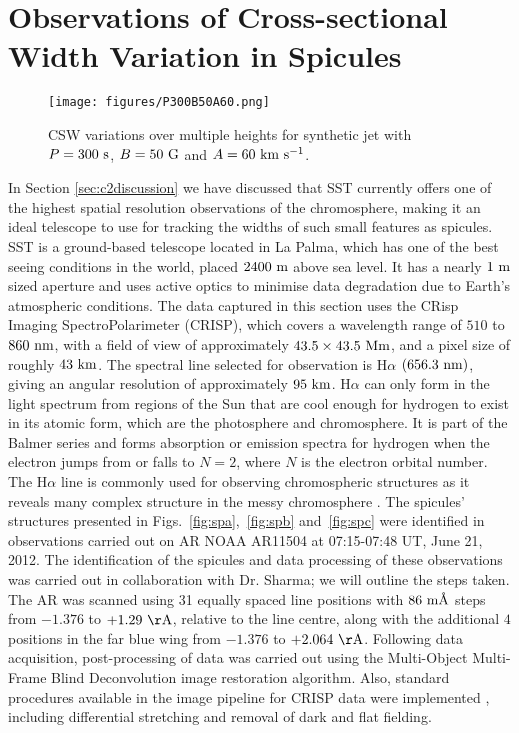 \section{Observations of Cross-sectional Width Variation in Spicules}
\label{sec:CSW_spicules}
\begin{figure*}
\texttt{[image: figures/P300B50A60.png]}
\caption{CSW variations over multiple heights for synthetic jet with $P=300~\rm{s}$, $B=50~\rm{G}$ and $A=60~\rm{km ~s^{-1}}$.} 
\label{CSW_m_heights} 
\end{figure*}
In Section \ref{sec:c2discussion} we have discussed that SST currently offers one of the highest spatial resolution observations of the chromosphere, making it an ideal telescope to use for tracking the widths of such small features as spicules. SST is a ground-based telescope located in La Palma, which has one of the best seeing conditions in the world, placed $2400~\rm{m}$ above sea level. It has a nearly $1~\rm{m}$ sized aperture and uses active optics to minimise data degradation due to Earth's atmospheric conditions. The data captured in this section uses the CRisp Imaging SpectroPolarimeter (CRISP), which covers a wavelength range of $510$ to $860~\rm{nm}$, with a field of view of approximately $43.5\times43.5~\rm{Mm}$, and a pixel size of roughly $43~\rm{km}$. The spectral line selected for observation is H$\alpha$ $(656.3~\rm{nm})$, giving an angular resolution of approximately $95~\rm{km}$. H$\alpha$ can only form in the light spectrum from regions of the Sun that are cool enough for hydrogen to exist in its atomic form, which are the photosphere and chromosphere. It is part of the Balmer series and forms absorption or emission spectra for hydrogen when the electron jumps from or falls to $N=2$, where $N$ is the electron orbital number. The H$\alpha$ line is commonly used for observing chromospheric structures as it reveals many complex structure in the messy chromosphere \citep{Parmenter1966PASP78250P, von1985AA146192V, Nishikawa1988PASJ40613N, Judge2006ASPC354259J, Leenaarts2007AA473625L, Rutten2008ASPC39754R, Jess2012ApJ744L5J, Pereira2016ApJ82465P, Rutten2017AA598A89R}. \np
The spicules' structures presented in Figs.~\ref{fig:spa},~\ref{fig:spb} and~\ref{fig:spc} were identified in observations carried out on AR NOAA AR11504 at 07:15-07:48 UT, June 21, 2012. The identification of the spicules and data processing of these observations was carried out in collaboration with Dr. Sharma; we will outline the steps taken. The AR was scanned using 31 equally spaced line positions with $86~\rm{m\textup{\AA}}$ steps from $-1.376$ to $+1.29~\rm{\AA}$, relative to the line centre, along with the additional $4$ positions in the far blue wing from $-1.376$ to $+2.064~\rm{\AA}$. Following data acquisition, post-processing of data was carried out using the Multi-Object Multi-Frame Blind Deconvolution \citep[MOMFBD;][]{van2005SoPh228191V} image restoration algorithm. Also, standard procedures available in the image pipeline for CRISP data were implemented \citep{2015}, including differential stretching and removal of dark and flat fielding. \np
